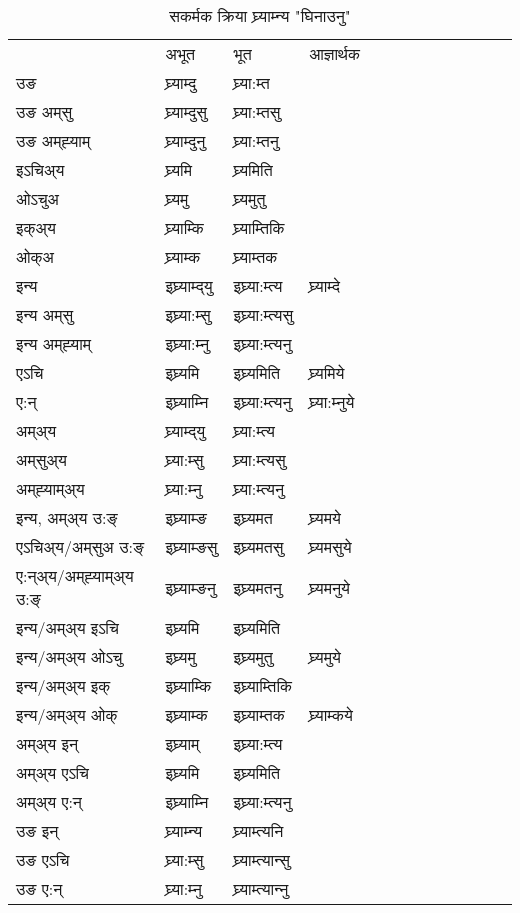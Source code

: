 \begin{table}[H]
\centering
\caption{\label{ɛmt.vt} सकर्मक क्रिया  घ्र्याम्‍न्य  "घिनाउनु"  }
\begin{tabular}{l|l|l|l|l|l|l|l|l|l|l|l|l}  \toprule
&अभूत & भूत & आज्ञार्थक \\ 
उङ &घ्र्याम्दु &घ्र्या:म्त \\ 
उङ अम्‌सु&घ्र्याम्दुसु &घ्र्या:म्तसु \\ 
उङ अम्‌ह्‍याम्&घ्र्याम्दुनु &घ्र्या:म्तनु \\ 
इऽचिअ्य &घ्र्यमि &घ्र्यमिति   \\ 
ओऽचुअ        &घ्र्यमु &घ्र्यमुतु   \\ 
इक्अ्य&घ्र्याम्कि &घ्र्याम्तिकि   \\ 
ओक्अ &घ्र्याम्क &घ्र्याम्तक   \\ 
इन्य & इघ्र्याम्द्‌यु  & इघ्र्या:म्त्य &घ्र्याम्दे  \\ 
इन्य अम्‌सु& इघ्र्या:म्सु  & इघ्र्या:म्त्यसु   \\ 
इन्य अम्‌ह्‍याम्& इघ्र्या:म्‍नु  & इघ्र्या:म्त्यनु   \\ 
एऽचि & इघ्र्यमि & इघ्र्यमिति &घ्र्यमिये    \\ 
ए:न् & इघ्र्याम्‍नि  & इघ्र्या:म्त्यनु &घ्र्या:म्‍नुये  \\ 
अम्अ्य & घ्र्याम्द्‌यु  & घ्र्या:म्त्य  \\ 
अम्‌सुअ्य & घ्र्या:म्सु & घ्र्या:म्त्यसु  \\ 
अम्‌ह्‍याम्अ्य & घ्र्या:म्‍नु  & घ्र्या:म्त्यनु \\ 
\midrule
इन्य, अम्अ्य उ:ङ्‌ &इघ्र्याम्ङ &इघ्र्यमत &घ्र्यमये \\ 
एऽचिअ्य/अम्‌सुअ उ:ङ्‌ &इघ्र्याम्ङसु &इघ्र्यमतसु &घ्र्यमसुये \\ 
ए:न्अ्य/अम्‌ह्‍याम्अ्य उ:ङ्‌ &इघ्र्याम्ङनु &इघ्र्यमतनु &घ्र्यमनुये \\ 
इन्य/अम्अ्य इऽचि &इघ्र्यमि &इघ्र्यमिति    \\ 
इन्य/अम्अ्य ओऽचु &इघ्र्यमु &इघ्र्यमुतु  &घ्र्यमुये  \\ 
इन्य/अम्अ्य इक् &इघ्र्याम्कि &इघ्र्याम्तिकि   \\ 
इन्य/अम्अ्य ओक् &इघ्र्याम्क &इघ्र्याम्तक  &घ्र्याम्कये  \\ 
अम्अ्य इन् & इघ्र्याम् & इघ्र्या:म्त्य   \\ 
अम्अ्य एऽचि & इघ्र्यमि & इघ्र्यमिति    \\ 
अम्अ्य ए:न् & इघ्र्याम्‍नि  & इघ्र्या:म्त्यनु  \\ 
\midrule
उङ इन् & घ्र्याम्‍न्य  & घ्र्याम्त्यनि  \\ 
उङ एऽचि & घ्र्या:म्सु  & घ्र्याम्त्यान्सु   \\ 
उङ ए:न्& घ्र्या:म्‍नु  & घ्र्याम्त्यान्‍नु   \\ 
\bottomrule
\end{tabular}
\end{table}


